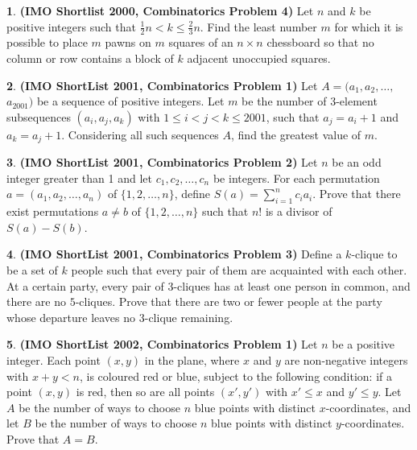\documentclass{article}
\theoremstyle{definition}
\newtheorem{p}{}
\begin{document}
\begin{p}{\bf (IMO Shortlist 2000, Combinatorics Problem 4)}
Let $ n$ and $ k$ be positive integers such that $ \frac{1}{2} n < k \leq \frac{2}{3} n.$ Find the least number $ m$ for which it is possible to place $ m$ pawns on $ m$ squares of an $ n \times n$ chessboard so that no column or row contains a block of $ k$ adjacent unoccupied squares.
\end{p}



\begin{p}{\bf(IMO ShortList 2001, Combinatorics Problem 1)}
Let $A = (a_1, a_2, \ldots,$  $a_{2001})$ be a sequence of positive integers. Let $m$ be the number of 3-element subsequences $(a_i,a_j,a_k)$ with $1 \leq i < j < k \leq 2001$, such that $a_j = a_i + 1$ and $a_k = a_j + 1$.  Considering all such sequences $A$, find the greatest value of $m$.
\end{p}





\begin{p}{\bf(IMO ShortList 2001, Combinatorics Problem 2)}
Let $n$ be an odd integer greater than 1 and let $c_1, c_2, \ldots, c_n$ be integers. For each permutation $a = (a_1, a_2, \ldots, a_n)$ of $\{1,2,\ldots,n\}$, define $S(a) = \sum_{i=1}^n c_i a_i$. Prove that there exist permutations $a \neq b$ of $\{1,2,\ldots,n\}$ such that $n!$ is a divisor of $S(a)-S(b)$.
\end{p}


\begin{p}{\bf(IMO ShortList 2001, Combinatorics Problem 3)}
Define a $k$-clique to be a set of $k$ people such that every pair of them are acquainted with each other. At a certain party, every pair of 3-cliques has at least one person in common, and there are no $5$-cliques. Prove that there are two or fewer people at the party whose departure leaves no $3$-clique remaining.
\end{p}



\begin{p}{\bf(IMO ShortList 2002, Combinatorics Problem 1)}
Let $n$ be a positive integer. Each point $(x,y)$ in the plane, where $x$ and $y$ are non-negative integers with $x+y<n$, is coloured red or blue, subject to the following condition: if a point $(x,y)$ is red, then so are all points $(x',y')$ with $x'\leq x$ and $y'\leq y$. Let $A$ be the number of ways to choose $n$ blue points with distinct $x$-coordinates, and let $B$ be the number of ways to choose $n$ blue points with distinct $y$-coordinates. Prove that $A=B$.
\end{p}
\end{document}
